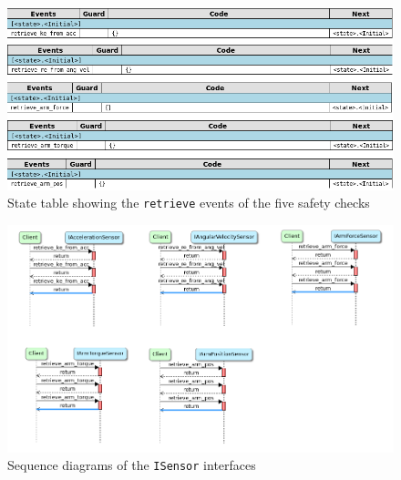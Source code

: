\documentclass[12pt]{scrreprt}
\begin{document}
\begin{figure}[H]
    \centering
    \includegraphics[width=\textwidth]{Figures/results/modelling_figures/ISensor/ISensor_state_table.png}
    \caption{State table showing the \texttt{retrieve} events of the five safety checks}
    \label{fig:retrieve events}
\end{figure}

\begin{figure}[H]
    \centering
    \includegraphics[width=\textwidth]{Figures/results/modelling_figures/ISensor/ISensor_seq.png}
    \caption{Sequence diagrams of the \texttt{ISensor} interfaces}
    \label{fig:isensor_seq}
\end{figure}
\end{document}
